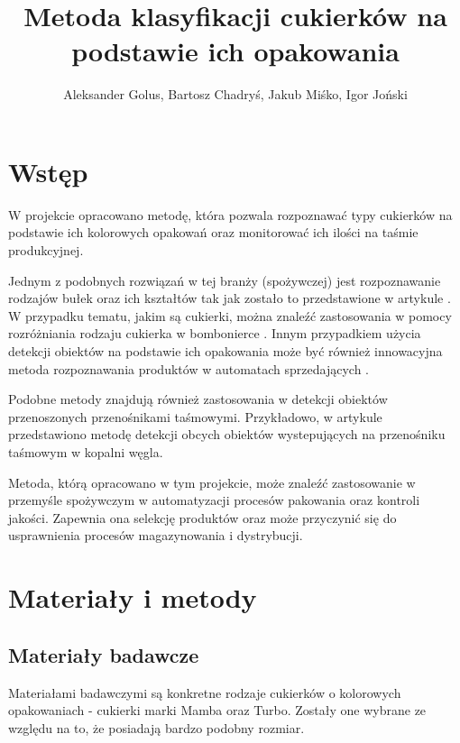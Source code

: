 \documentclass{article}
\title{Metoda klasyfikacji cukierków na podstawie ich opakowania}
\author{Aleksander Golus, Bartosz Chadryś, Jakub Miśko, Igor Joński}
\begin{document}
\maketitle

\newpage


\section{Wstęp}
\label{Wstęp}
W projekcie opracowano metodę, która pozwala rozpoznawać typy cukierków na podstawie ich kolorowych opakowań oraz monitorować ich ilości na taśmie produkcyjnej.

Jednym z podobnych rozwiązań w tej branży (spożywczej) jest rozpoznawanie rodzajów bułek oraz ich kształtów tak jak zostało to przedstawione w artykule \cite{virtuslab}. W przypadku tematu, jakim są cukierki, można znaleźć zastosowania w pomocy rozróżniania rodzaju cukierka w bombonierce \cite{chocolates}. Innym przypadkiem użycia detekcji obiektów na podstawie ich opakowania może być również innowacyjna metoda rozpoznawania produktów w automatach sprzedających \cite{vending}.

Podobne metody znajdują również zastosowania w detekcji obiektów przenoszonych przenośnikami taśmowymi. Przykładowo, w artykule \cite{coalForeign} przedstawiono metodę detekcji obcych obiektów wystepujących na przenośniku taśmowym w kopalni węgla.

Metoda, którą opracowano w tym projekcie, może znaleźć zastosowanie w przemyśle spożywczym w automatyzacji procesów pakowania oraz kontroli jakości. Zapewnia ona selekcję produktów oraz może przyczynić się do usprawnienia procesów magazynowania i dystrybucji.

\section{Materiały i metody}
\label{Materiały i metody}
\subsection{Materiały badawcze}
\label{Materiały badawcze}
Materiałami badawczymi są konkretne rodzaje cukierków o kolorowych opakowaniach - cukierki marki Mamba oraz Turbo. Zostały one wybrane ze względu na to, że posiadają bardzo podobny rozmiar.
\end{document}
